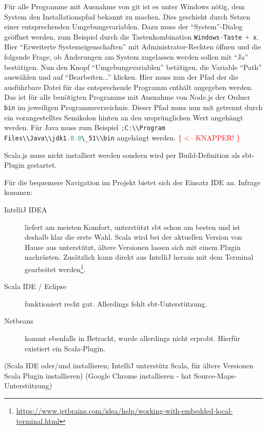 \documentclass[a4paper, 12pt, hidelinks, listof=totoc, listoftables=totoc, bibliography=totoc]{scrreprt}
\newcommand{\code}[1]{\lstinline[language=Scala, style=inline]|#1|}
\newcommand{\TODOi}[1]{\textcolor{red}{\{#1\}}}
\begin{document}
Für alle Programme mit Ausnahme von git ist es unter Windows nötig, dem System den Installationspfad bekannt zu machen. Dies geschieht durch Setzen einer entsprechenden Umgebungsvariablen. Dazu muss der "`System"'-Dialog geöffnet werden, zum Beispiel durch die Tastenkombination \code{Windows-Taste + x}. Hier "`Erweiterte Systemeigenschaften"' mit Administrator-Rechten öffnen und die folgende Frage, ob Änderungen am System zugelassen werden sollen mit "`Ja"' bestätigen. Nun den Knopf "`Umgebungsvariablen"' betätigen, die Variable "`Path"' auswählen und auf "`Bearbeiten..."' klicken. Hier muss nun der Pfad der die ausführbare Datei für das entsprechende Programm enthält angegeben werden. Das ist für alle benötigten Programme mit Ausnahme von Node.js der Ordner \code{bin} im jeweiligen Programmverzeichnis. Dieser Pfad muss nun mit getrennt durch ein vorangestelltes Semikolon hinten an den ursprünglichen Wert angehängt werden. Für Java muss zum Beispiel \code{;C:\\Program Files\\Java\\jdk1.8.0\_51\\bin} angehängt werden. \TODOi{ <-- KNAPPER! }

Scala.js muss nicht installiert werden sondern wird per Build-Definition als sbt-Plugin gestartet.

Für die bequemere Navigation im Projekt bietet sich der Einsatz \ac{IDE} an. Infrage kommen:

\begin{description}
	\item[IntelliJ IDEA] liefert am meisten Komfort, unterstützt sbt schon am besten und ist deshalb klar die erste Wahl. Scala wird bei der aktuellen Version von Hause aus unterstützt, ältere Versionen lassen sich mit einem Plugin nachrüsten. Zusätzlich kann direkt aus IntelliJ heraus mit dem Terminal gearbeitet werden\footnote{\url{https://www.jetbrains.com/idea/help/working-with-embedded-local-terminal.html}}.
	
	
	\item[Scala IDE / Eclipse] funktioniert recht gut. Allerdings fehlt sbt-Unterstützung.
	\item[Netbeans] kommt ebenfalls in Betracht, wurde allerdings nicht erprobt. Hierfür existiert ein Scala-Plugin.
\end{description}


(Scala \ac{IDE} oder/und  installieren; IntelliJ unterstütz Scala, für ältere Versionen Scala Plugin installieren)
(Google Chrome installieren - hat Source-Maps-Unterstützung)
\end{document}
